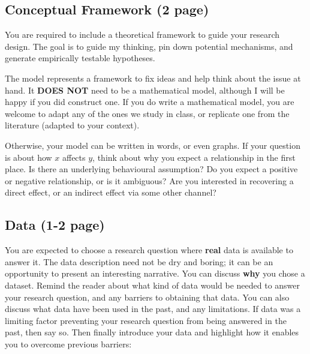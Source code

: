\documentclass[
]{article}
\begin{document}
\hypertarget{conceptual-framework-2-page}{%
\subsection{Conceptual Framework (2 page)}\label{conceptual-framework-2-page}}

You are required to include a theoretical framework to guide your research design. The goal is to guide my thinking, pin down potential mechanisms, and generate empirically testable hypotheses.

The model represents a framework to fix ideas and help think about the issue at hand. It \textbf{DOES NOT} need to be a mathematical model, although I will be happy if you did construct one. If you do write a mathematical model, you are welcome to adapt any of the ones we study in class, or replicate one from the literature (adapted to your context).

Otherwise, your model can be written in words, or even graphs. If your question is about how \(x\) affects \(y\), think about why you expect a relationship in the first place. Is there an underlying behavioural assumption? Do you expect a positive or negative relationship, or is it ambiguous? Are you interested in recovering a direct effect, or an indirect effect via some other channel?

\hypertarget{data-1-2-page}{%
\subsection{Data (1-2 page)}\label{data-1-2-page}}

You are expected to choose a research question where \textbf{real} data is available to answer it. The data description need not be dry and boring; it can be an opportunity to present an interesting narrative. You can discuss \textbf{why} you chose a dataset. Remind the reader about what kind of data would be needed to answer your research question, and any barriers to obtaining that data. You can also discuss what data have been used in the past, and any limitations. If data was a limiting factor preventing your research question from being answered in the past, then say so. Then finally introduce your data and highlight how it enables you to overcome previous barriers:
\end{document}
